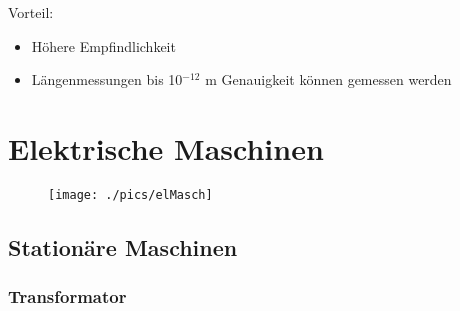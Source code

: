 				Vorteil:
				\begin{itemize}
					\item Höhere Empfindlichkeit 
					\item Längenmessungen bis 10$ ^{-12} $ m Genauigkeit können gemessen werden
				\end{itemize}
		
		
		

	\section{Elektrische Maschinen}
		\leavevmode
		\begin{figure}[h]
			\centering
			\texttt{[image: ./pics/elMasch]}
		\end{figure}
		\subsection{Stationäre Maschinen}
		\subsubsection{Transformator}
